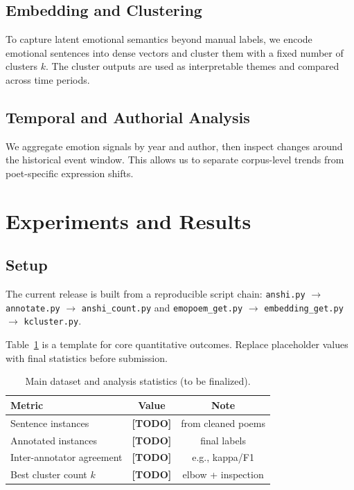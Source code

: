 \documentclass[11pt]{article}
\begin{document}
\subsection{Embedding and Clustering}

To capture latent emotional semantics beyond manual labels, we encode emotional sentences into dense vectors and cluster them with a fixed number of clusters \(k\).
The cluster outputs are used as interpretable themes and compared across time periods.

\subsection{Temporal and Authorial Analysis}

We aggregate emotion signals by year and author, then inspect changes around the historical event window.
This allows us to separate corpus-level trends from poet-specific expression shifts.

\section{Experiments and Results}

\subsection{Setup}

The current release is built from a reproducible script chain:
\texttt{anshi.py} \(\rightarrow\) \texttt{annotate.py} \(\rightarrow\) \texttt{anshi\_count.py} and
\texttt{emopoem\_get.py} \(\rightarrow\) \texttt{embedding\_get.py} \(\rightarrow\) \texttt{kcluster.py}.

Table~\ref{tab:main_results} is a template for core quantitative outcomes.
Replace placeholder values with final statistics before submission.

\begin{table}[t]
\centering
\small
\begin{tabular}{lcc}
\toprule
Metric & Value & Note \\
\midrule
Sentence instances & \textbf{[TODO]} & from cleaned poems \\
Annotated instances & \textbf{[TODO]} & final labels \\
Inter-annotator agreement & \textbf{[TODO]} & e.g., kappa/F1 \\
Best cluster count \(k\) & \textbf{[TODO]} & elbow + inspection \\
\bottomrule
\end{tabular}
\caption{Main dataset and analysis statistics (to be finalized).}
\label{tab:main_results}
\end{table}
\end{document}
